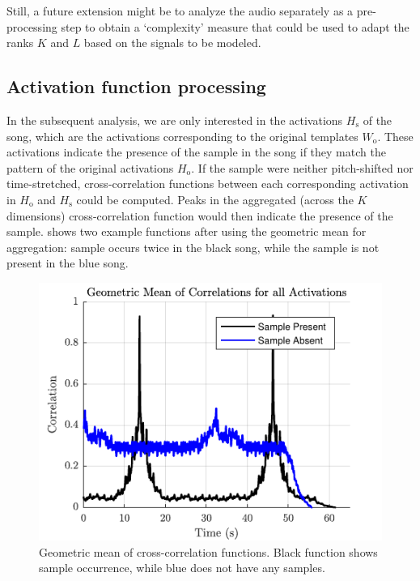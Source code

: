\documentclass{article}
\begin{document}
Still, a future extension might be to analyze the audio separately as a pre-processing step to obtain a `complexity' measure that could be used to adapt the ranks $K$ and $L$ based on the signals to be modeled. 

\subsection{Activation function processing}
In the subsequent analysis, we are only interested in the activations $H_\mathrm{s}$ of the song, which are the activations corresponding to the original templates $W_\mathrm{o}$. These activations indicate the presence of the sample in the song if they match the pattern of the original activations $H_\mathrm{o}$. If the sample were neither pitch-shifted nor time-stretched, cross-correlation functions between each corresponding activation in $H_\mathrm{o}$ and $H_\mathrm{s}$ could be computed. Peaks in the aggregated (across the $K$ dimensions) cross-correlation function would then indicate the presence of the sample.  shows two example functions after using the geometric mean for aggregation: sample occurs twice in the black song, while the sample is not present in the blue song.


\begin{figure}[t]
\centering
\includegraphics[width=\linewidth]{correlation.pdf}
\caption{Geometric mean of cross-correlation functions. Black function shows sample occurrence, while blue does not have any samples.}
\label{fig1}
\end{figure}
\end{document}
